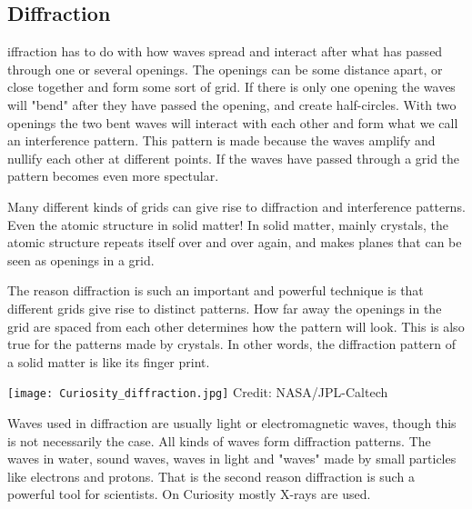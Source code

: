 \subsection{Diffraction}
iffraction has to do with how waves spread and interact after what has passed through one or several openings.
The openings can be some distance apart, or close together and form some sort of grid.
If there is only one opening the waves will "bend" after they have passed the opening, and create half-circles.
With two openings the two bent waves will interact with each other and form what we call an interference pattern.
This pattern is made because the waves amplify and nullify each other at different points.
If the waves have passed through a grid the pattern becomes even more spectular.

Many different kinds of grids can give rise to diffraction and interference patterns.
Even the atomic structure in solid matter!
In solid matter, mainly crystals, the atomic structure repeats itself over and over again, and makes planes that can be seen as openings in a grid.

The reason diffraction is such an important and powerful technique is that different grids give rise to distinct patterns.
How far away the openings in the grid are spaced from each other determines how the pattern will look.
This is also true for the patterns made by crystals.
In other words, the diffraction pattern of a solid matter is like its finger print.

\begin{center}
	\texttt{[image: Curiosity\_diffraction.jpg]}
	\tiny{Credit: NASA/JPL-Caltech}
\end{center}

Waves used in diffraction are usually light or electromagnetic waves, though this is not necessarily the case.
All kinds of waves form diffraction patterns.
The waves in water, sound waves, waves in light and "waves" made by small particles like electrons and protons.
That is the second reason diffraction is such a powerful tool for scientists.
On Curiosity mostly X-rays are used.